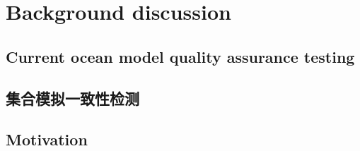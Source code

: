  

 


\introduction \label{sec:intro}


 




 
\section{Background discussion} \label{sec:back}

\subsection{Current ocean model quality assurance testing}

   



\subsection{集合模拟一致性检测}









\subsection{Motivation}

